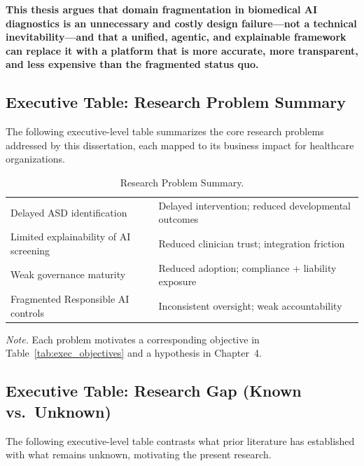\textbf{This thesis argues that domain fragmentation in biomedical AI diagnostics is an unnecessary and costly design failure---not a technical inevitability---and that a unified, agentic, and explainable framework can replace it with a platform that is more accurate, more transparent, and less expensive than the fragmented status quo.}



\subsection{Executive Table: Research Problem Summary}
\label{sec:exec_research_problem}

\noindent The following executive-level table summarizes the core research problems addressed by this dissertation, each mapped to its business impact for healthcare organizations.

{\tablestripes\tablefontsize
{}
\begin{xltabular}{\textwidth}{@{} >{\raggedright\arraybackslash}p{6cm} L @{}}
\caption[Research Problem Summary]{Research Problem Summary.}\label{tab:exec_research_problem} \\
\toprule
{} &  \\
\midrule
\endfirsthead
\endhead
\bottomrule
\endlastfoot
Delayed ASD identification & Delayed intervention; reduced developmental outcomes \\
\addlinespace
Limited explainability of AI screening & Reduced clinician trust; integration friction \\
\addlinespace
Weak governance maturity & Reduced adoption; compliance + liability exposure \\
\addlinespace
Fragmented Responsible AI controls & Inconsistent oversight; weak accountability \\
\end{xltabular}}
\vspace{0.3em}\noindent\textit{Note.} Each problem motivates a corresponding objective in Table~\ref{tab:exec_objectives} and a hypothesis in Chapter~4.


\subsection{Executive Table: Research Gap (Known vs.\ Unknown)}
\label{sec:exec_research_gap}

\noindent The following executive-level table contrasts what prior literature has established with what remains unknown, motivating the present research.

